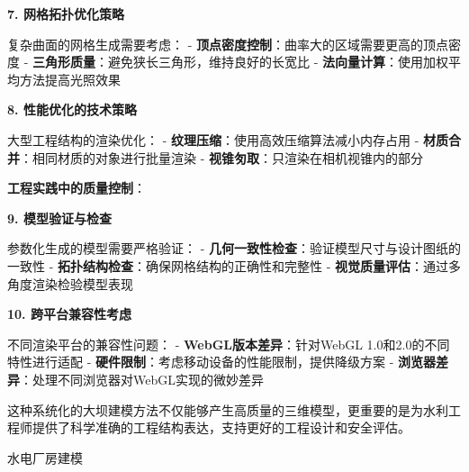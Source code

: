 \textbf{7. 网格拓扑优化策略}

复杂曲面的网格生成需要考虑： - \textbf{顶点密度控制}：曲率大的区域需要更高的顶点密度 - \textbf{三角形质量}：避免狭长三角形，维持良好的长宽比 - \textbf{法向量计算}：使用加权平均方法提高光照效果

\textbf{8. 性能优化的技术策略}

大型工程结构的渲染优化： - \textbf{纹理压缩}：使用高效压缩算法减小内存占用 - \textbf{材质合并}：相同材质的对象进行批量渲染 - \textbf{视锥匇取}：只渲染在相机视锥内的部分

\textbf{工程实践中的质量控制}：

\textbf{9. 模型验证与检查}

参数化生成的模型需要严格验证： - \textbf{几何一致性检查}：验证模型尺寸与设计图纸的一致性 - \textbf{拓扑结构检查}：确保网格结构的正确性和完整性 - \textbf{视觉质量评估}：通过多角度渲染检验模型表现

\textbf{10. 跨平台兼容性考虑}

不同渲染平台的兼容性问题： - \textbf{WebGL版本差异}：针对WebGL 1.0和2.0的不同特性进行适配 - \textbf{硬件限制}：考虑移动设备的性能限制，提供降级方案 - \textbf{浏览器差异}：处理不同浏览器对WebGL实现的微妙差异

这种系统化的大坝建模方法不仅能够产生高质量的三维模型，更重要的是为水利工程师提供了科学准确的工程结构表达，支持更好的工程设计和安全评估。

 水电厂房建模

